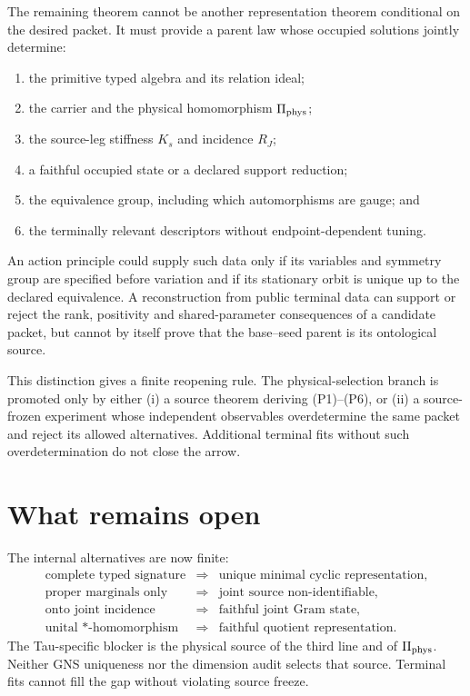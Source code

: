 \documentclass[11pt]{article}
\begin{document}
The remaining theorem cannot be another representation theorem conditional on
the desired packet.  It must provide a parent law whose occupied solutions
jointly determine:
\begin{enumerate}[label=(P\arabic*)]
 \item the primitive typed algebra and its relation ideal;
 \item the carrier and the physical homomorphism \(\Pi_{\rm phys}\);
 \item the source-leg stiffness \(K_s\) and incidence \(R_J\);
 \item a faithful occupied state or a declared support reduction;
 \item the equivalence group, including which automorphisms are gauge; and
 \item the terminally relevant descriptors without endpoint-dependent
 tuning.
\end{enumerate}
An action principle could supply such data only if its variables and symmetry
group are specified before variation and if its stationary orbit is unique up
to the declared equivalence.  A reconstruction from public terminal data can
support or reject the rank, positivity and shared-parameter consequences of a
candidate packet, but cannot by itself prove that the base--seed parent is its
ontological source.

This distinction gives a finite reopening rule.  The physical-selection branch
is promoted only by either (i) a source theorem deriving (P1)--(P6), or (ii) a
source-frozen experiment whose independent observables overdetermine the same
packet and reject its allowed alternatives.  Additional terminal fits without
such overdetermination do not close the arrow.

\section{What remains open}

The internal alternatives are now finite:
\begin{equation}
 \begin{array}{ccl}
 \text{complete typed signature}&\Rightarrow&\text{unique minimal cyclic representation},\\
 \text{proper marginals only}&\Rightarrow&\text{joint source non-identifiable},\\
 \text{onto joint incidence}&\Rightarrow&\text{faithful joint Gram state},\\
 \text{unital \(*\)-homomorphism}&\Rightarrow&\text{faithful quotient representation}.
 \end{array}
\end{equation}
The Tau-specific blocker is the physical source of the third line and of
\(\Pi_{\rm phys}\).  Neither GNS uniqueness nor the dimension audit selects
that source.  Terminal fits cannot fill the gap without violating source
freeze.
\end{document}
